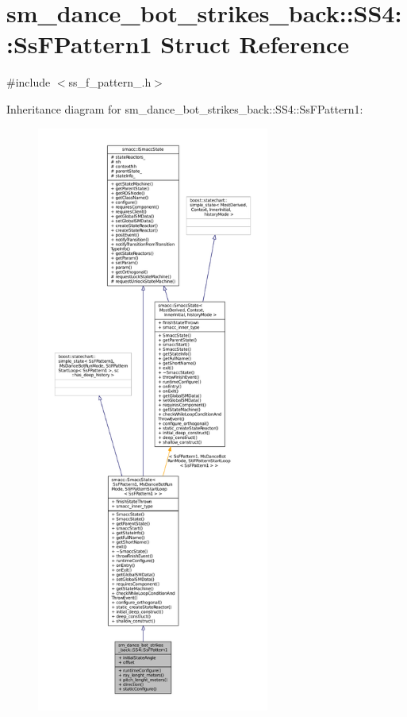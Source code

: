 \hypertarget{structsm__dance__bot__strikes__back_1_1SS4_1_1SsFPattern1}{}\section{sm\+\_\+dance\+\_\+bot\+\_\+strikes\+\_\+back\+:\+:S\+S4\+:\+:Ss\+F\+Pattern1 Struct Reference}
\label{structsm__dance__bot__strikes__back_1_1SS4_1_1SsFPattern1}


{\ttfamily \#include $<$ss\+\_\+f\+\_\+pattern\+\_.\+h$>$}



Inheritance diagram for sm\+\_\+dance\+\_\+bot\+\_\+strikes\+\_\+back\+:\+:S\+S4\+:\+:Ss\+F\+Pattern1\+:
\nopagebreak
\begin{figure}[H]
\begin{center}
\leavevmode
\includegraphics[height=550pt]{structsm__dance__bot__strikes__back_1_1SS4_1_1SsFPattern1__inherit__graph}
\end{center}
\end{figure}


